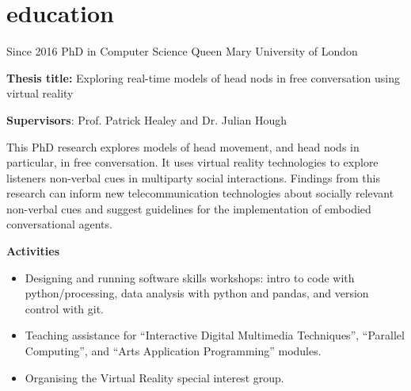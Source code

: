 \documentclass[]{friggeri-cv}
\begin{document}

\section{education}

\begin{entrylist}

    \entry
    {Since 2016}
    {PhD in Computer Science}
    {Queen Mary University of London}
    {
      \textbf{Thesis title:} Exploring real-time models of head nods in free conversation using virtual reality

      \textbf{Supervisors}: Prof. Patrick Healey and Dr. Julian Hough

      This PhD research explores models of head movement, and head nods in particular, in free conversation.
      It uses virtual reality technologies to explore listeners non-verbal cues in multiparty social interactions.
      Findings from this research can inform new telecommunication technologies about socially relevant non-verbal cues and suggest guidelines for the implementation of embodied conversational agents.

      \textbf{Activities}
      \begin{itemize}
        \item
          Designing and running software skills workshops: intro to code with python/processing, data analysis with python and pandas, and version control with git.
        \item
          Teaching assistance for ``Interactive Digital Multimedia Techniques'', ``Parallel Computing'', and ``Arts Application Programming'' modules.
        \item
          Organising the Virtual Reality special interest group.
      \end{itemize}
    }

\end{entrylist}
\end{document}
